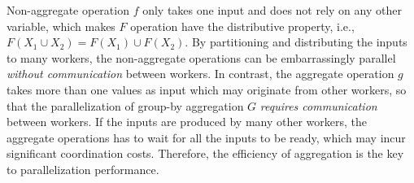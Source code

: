 

 Non-aggregate operation $f$ only takes one input and does not rely on any other variable, which makes $F$ operation have the distributive property, i.e., $F(X_1 \cup X_2)=F(X_1) \cup F(X_2)$. By partitioning and distributing the inputs to many workers, the non-aggregate operations can be embarrassingly parallel \emph{without communication} between workers. In contrast, the aggregate operation $g$ takes more than one values as input which may originate from other workers, so that the parallelization of group-by aggregation $G$ \emph{requires communication} between workers. If the inputs are produced by many other workers, the aggregate operations has to wait for all the inputs to be ready, which may incur significant coordination costs. Therefore, the efficiency of aggregation is the key to parallelization performance.




